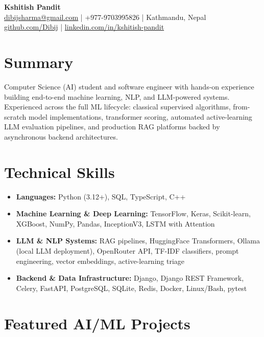 \documentclass[a4paper,10pt]{article}
\begin{document}
\begin{center}
    {\LARGE \textbf{Kshitish Pandit}} \\[4pt]
    \href{mailto:dibijsharma@gmail.com}{dibijsharma@gmail.com} \quad | \quad +977-9703995826 \quad | \quad Kathmandu, Nepal \\[2pt]
    \href{https://github.com/Dibij}{github.com/Dibij} \quad | \quad
    \href{https://www.linkedin.com/in/kshitish-pandit}{linkedin.com/in/kshitish-pandit}
\end{center}

\vspace{2pt}

\section*{Summary}
Computer Science (AI) student and software engineer with hands-on experience building end-to-end machine learning, NLP, and LLM-powered systems. Experienced across the full ML lifecycle: classical supervised algorithms, from-scratch model implementations, transformer scoring, automated active-learning LLM evaluation pipelines, and production RAG platforms backed by asynchronous backend architectures.

\section*{Technical Skills}
\begin{itemize}
    \item \textbf{Languages:} Python (3.12+), SQL, TypeScript, C++
    \item \textbf{Machine Learning \& Deep Learning:} TensorFlow, Keras, Scikit-learn, XGBoost, NumPy, Pandas, InceptionV3, LSTM with Attention
    \item \textbf{LLM \& NLP Systems:} RAG pipelines, HuggingFace Transformers, Ollama (local LLM deployment), OpenRouter API, TF-IDF classifiers, prompt engineering, vector embeddings, active-learning triage
    \item \textbf{Backend \& Data Infrastructure:} Django, Django REST Framework, Celery, FastAPI, PostgreSQL, SQLite, Redis, Docker, Linux/Bash, pytest
\end{itemize}

\section*{Featured AI/ML Projects}
\end{document}
